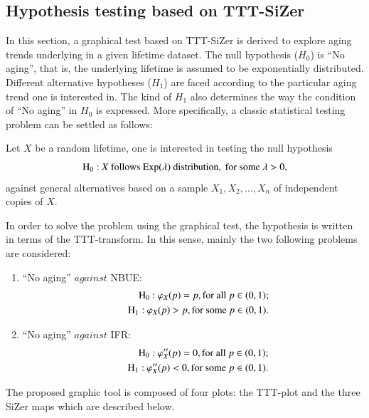 \documentclass[preprint,12pt]{elsarticle}
\begin{document}
\subsection{Hypothesis testing based on TTT-SiZer}

In this section, a graphical test based on TTT-SiZer is derived to explore aging  trends underlying in a given lifetime dataset. The null hypothesis ($H_0$) is ``No aging'', that is, the underlying lifetime is assumed to be exponentially distributed. Different alternative hypotheses ($H_1$) are faced according to the particular aging trend one is interested in. The kind of $H_1$ also determines the way the condition of ``No aging'' in $H_0$ is expressed. More specifically, a classic statistical testing problem can be settled  as follows:

 \noindent Let $X$ be a random lifetime,  one is interested in testing the null hypothesis 
\[
{\rm H_0 :} \ X \ {\rm follows \ Exp}(\lambda) \ {\rm distribution,\ for \ some \ } \lambda >0,
\]
against general alternatives based on a sample $X_1, X_2,\ldots, X_n$ of independent copies of $X$.

In order to solve the problem using the graphical test, the hypothesis is written in terms of the TTT-transform. In this sense, mainly the two following problems are considered: 
\begin{enumerate}

\item ``No aging'' $against$ NBUE:
\begin{eqnarray} \label{test_nbue}
\nonumber &&{\rm H_0 :} \ \varphi_X(p)= p, {\rm for \ all \ } p \in (0,1); \\
&&{\rm H_1 :} \ \varphi_X(p) >  p, {\rm for \ some \ }  p \in (0,1).
\end{eqnarray}


\item ``No aging'' $against$ IFR:
\begin{eqnarray} \label{test_ifr}
\nonumber &&{\rm H_0 :} \ \varphi_X''(p)= 0, {\rm for \ all \ } p \in (0,1); \\
&&{\rm H_1 :} \ \varphi_X''(p) < 0, {\rm for \ some \ }  p \in (0,1).
\end{eqnarray}

\end{enumerate}



The proposed graphic tool is composed of  four plots: the TTT-plot and the three SiZer maps which are described below.
\end{document}
